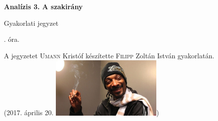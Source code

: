 \documentclass[a4paper,11.5pt]{article}
\begin{document}
	\setlength\parindent{0pt}
	\def\a{\textbf{a}}
	\def\b{\textbf{b}}
	\def\N{\hskip 10 true mm}
	\def\a{\textbf{a}}
	\def\b{\textbf{b}}
	\def\c{\textbf{c}}
	\def\d{\textbf{d}}
	\def\e{\textbf{e}}
	\def\gg{$\gamma$}
	\def\vi{\textbf{i}}
	\def\jj{\textbf{j}}
	\def\kk{\textbf{k}}
	\def\fh{\overrightarrow}
	\def\l{\lambda}
	\def\m{\mu}
	\def\v{\textbf{v}}
	\def\0{\textbf{0}}
	\def\s{\hspace{0.2mm}\vphantom{\beta}}
	\def\Z{\mathbb{Z}}
	\def\Q{\mathbb{Q}}
	\def\R{\mathbb{R}}
	\def\C{\mathbb{C}}
	\def\N{\mathbb{N}}
	\def\Rn{\mathbb{R}^{n}}
	\def\Ra{\overline{\mathbb{R}}}
	\def\sume{\displaystyle\sum_{n=1}^{+\infty}}
	\def\sumn{\displaystyle\sum_{n=0}^{+\infty}}
	\def\biz{\emph{Bizonyítás:\ }}
	\def\narrow{\underset{n\rightarrow+\infty}{\longrightarrow}}
	\def\limn{\displaystyle\lim_{n\to +\infty}}
	
	\theoremstyle{definition}
	\newtheorem{theorem}{Tétel}[subsubsection] %
	
	\theoremstyle{definition}
	\newtheorem{definition}[theorem]{Definíció} %
	\newtheorem{example}[theorem]{Példa} %
	\newtheorem{exercise}[theorem]{Házi feladat} %
	\newtheorem{note}[theorem]{Megjegyzés} %
	\newtheorem{task}[theorem]{Feladat} %
	\newtheorem{revision}[theorem]{Emlékeztető} %
	\begin{center}
		{\LARGE\textbf{Analízis 3. A szakirány}}
		\smallskip
		
		{\Large Gyakorlati jegyzet}
		
		. óra.
	\end{center}
	A jegyzetet \textsc{Umann} Kristóf készítette \textsc{Filipp} Zoltán István gyakorlatán.\\ (2017. április 20.
	\includegraphics[height=3cm]{../2zh/kepek/420.jpg}) 
\end{document}
